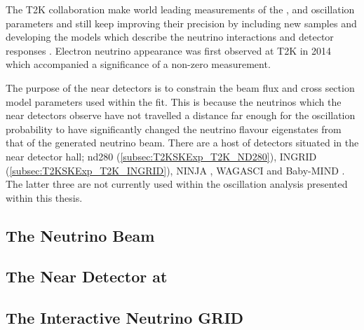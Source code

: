 The T2K collaboration make world leading measurements of the \sinsqatm, \delmsqatm and \dcp oscillation parameters and still keep improving their precision by including new samples and developing the models which describe the neutrino interactions and detector responses . Electron neutrino appearance was first observed at T2K in 2014 \cite{2014_Abe_ElectronNuApp} which accompanied a \quickmath{7.3\sigma} significance of a non-zero \sinsqreac measurement.

The purpose of the near detectors is to constrain the beam flux and cross section model parameters used within the fit. This is because the neutrinos which the near detectors observe have not travelled a distance far enough for the oscillation probability to have significantly changed the neutrino flavour eigenstates from that of the generated neutrino beam. There are a host of detectors situated in the near detector hall; nd280 (\autoref{subsec:T2KSKExp_T2K_ND280}), INGRID (\autoref{subsec:T2KSKExp_T2K_INGRID}), NINJA \cite{ninja}, WAGASCI \cite{wagasci} and Baby-MIND \cite{baby_mind}. The latter three are not currently used within the oscillation analysis presented within this thesis.

\subsection{The Neutrino Beam}
\label{subsec:T2KSKExp_T2K_NeutrinoBeam}

\subsection{The Near Detector at }
\label{subsec:T2KSKExp_T2K_ND280}

\subsection{The Interactive Neutrino GRID}
\label{subsec:T2KSKExp_T2K_INGRID}

